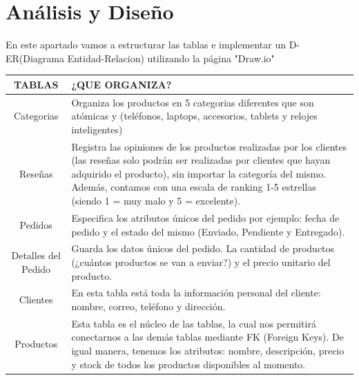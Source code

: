 \documentclass[10pt,letterpaper]{article}
\begin{document}
\section{Análisis y Diseño}
En este apartado vamos a estructurar  las tablas e implementar un D-ER(Diagrama Entidad-Relacion) utilizando la página "Draw.io"
\begin{table}[h]%
    \begin{tabular}{| c |p{9cm} |} %
        \hline
        TABLAS & ¿QUE ORGANIZA? \\
        \hline
        Categorias                 & Organiza los productos en 5 categorias diferentes que son atómicas y 
                                      (teléfonos, laptops, accesorios, tablets y relojes inteligentes) \\
        \hline
        Reseñas                    & Registra las opiniones de los productos realizadas por los clientes (las reseñas solo podrán ser realizadas por clientes 
                                     que hayan adquirido el producto), sin importar la categoría del mismo. Además, contamos con una escala de ranking
                                     1-5 estrellas (siendo 1 = muy malo y 5 = excelente). \\
        \hline
        Pedidos                    & Especifica los atributos únicos del pedido por ejemplo: fecha de pedido y el estado
                                      del mismo (Enviado, Pendiente y Entregado). \\
        \hline
        Detalles del Pedido        & Guarda los datos únicos del pedido. 
                                      La cantidad de productos (¿cuántos productos se van a enviar?) y el precio unitario del producto. \\
        \hline
        Clientes                   & En esta tabla está toda la información personal del cliente: nombre, correo, teléfono y dirección. \\
        \hline
        Productos                  & Esta tabla es el núcleo de las tablas, la cual nos permitirá conectarnos a las demás tablas mediante FK (Foreign Keys).
                                     De igual manera, tenemos los atributos: nombre, descripción, precio y stock de todos los
                                      productos disponibles al momento. \\
        \hline
    \end{tabular}
\end{table}
    \clearpage
\end{document}
